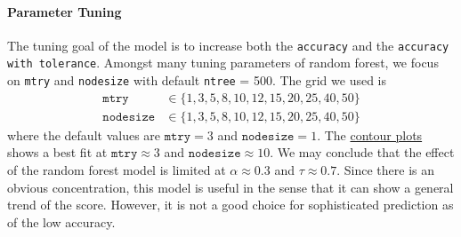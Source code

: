 \documentclass[8pt]{article}
\begin{document}
\paragraph{Parameter Tuning}
The tuning goal of the model is to increase both the \texttt{accuracy} and the \texttt{accuracy with tolerance}.
Amongst many tuning parameters of random forest, we focus on \texttt{mtry} and \texttt{nodesize} with default 
\texttt{ntree} = 500. The grid we used is 
\begin{align*}
    \texttt{mtry} &\in \{1, 3, 5, 8, 10, 12, 15, 20, 25, 40,  50 \} \\
    \texttt{nodesize} &\in \{1, 3, 5, 8, 10, 12, 15, 20, 25, 40,  50 \}
\end{align*}
where the default values are $\texttt{mtry} = 3$ and $\texttt{nodesize} = 1$. 
The \hyperref[fig:contour]{contour plots} shows a best fit at $\texttt{mtry} \approx 3$ and $\texttt{nodesize} \approx 10$.
We may conclude that the effect of the random forest model is limited at $\alpha \approx 0.3$
and $\tau \approx 0.7$. Since there is an obvious concentration, 
this model is useful in the sense that it can show a general trend of the score.
However, it is not a good choice for sophisticated prediction as of the low accuracy.
\end{document}
